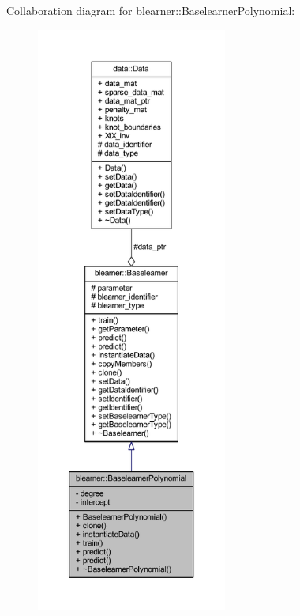 Collaboration diagram for blearner\+:\+:Baselearner\+Polynomial\+:
\nopagebreak
\begin{figure}[H]
\begin{center}
\leavevmode
\includegraphics[height=550pt]{classblearner_1_1_baselearner_polynomial__coll__graph}
\end{center}
\end{figure}

